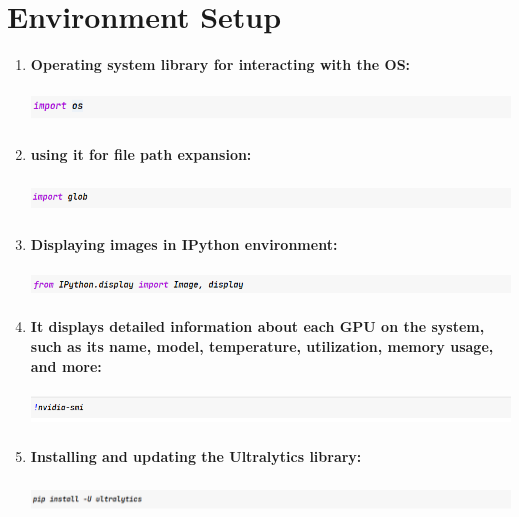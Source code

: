 \documentclass[12 pt]{report}
\begin{document}
\section{Environment Setup}
{
  \begin{enumerate}
    \item \textbf{ Operating system library for interacting with the OS:} 
    \begin{center}
        \includegraphics[width=17cm, height=1cm]{import Os.png}
    \end{center}

  \item \textbf{using it for file path expansion:}
  \begin{center}
      \includegraphics[width=17cm, height=1cm]{Import global.png}
  \end{center}

  \item \textbf{Displaying images in IPython environment:}
  \begin{center}
      \includegraphics[width=17cm, height=0.8cm]{Form Iphoton.display.png}
  \end{center}

  \item \textbf{ It displays detailed information about each GPU on the system, such as its name, model, temperature, utilization, memory usage, and more:}
  \begin{center}
      \includegraphics[width=17cm, height=1cm]{nvidia-smi.png}
  \end{center}

  \item \textbf{Installing and updating the Ultralytics library:}
  \begin{center}
      \includegraphics[width=17cm, height=1cm]{ipi install ultalatics.png}
  \end{center}



\end{enumerate}}
\end{document}

